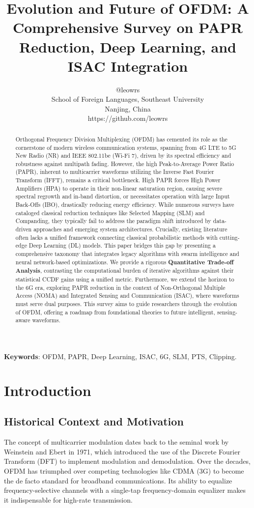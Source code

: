 \documentclass[12pt, a4paper, onecolumn]{article}
\title{\textbf{Evolution and Future of OFDM: A Comprehensive Survey on PAPR Reduction, Deep Learning, and ISAC Integration}}
\author{@leowrs \\
    \small School of Foreign Languages, Southeast University \\
    \small Nanjing, China \\
    \small https://github.com/leowrs}
\date{}
\begin{document}
\maketitle

\begin{abstract}
    Orthogonal Frequency Division Multiplexing (OFDM) has cemented its role as the cornerstone of modern wireless communication systems, spanning from 4G LTE to 5G New Radio (NR) and IEEE 802.11be (Wi-Fi 7), driven by its spectral efficiency and robustness against multipath fading. However, the high Peak-to-Average Power Ratio (PAPR), inherent to multicarrier waveforms utilizing the Inverse Fast Fourier Transform (IFFT), remains a critical bottleneck. High PAPR forces High Power Amplifiers (HPA) to operate in their non-linear saturation region, causing severe spectral regrowth and in-band distortion, or necessitates operation with large Input Back-Offs (IBO), drastically reducing energy efficiency. While numerous surveys have cataloged classical reduction techniques like Selected Mapping (SLM) and Companding, they typically fail to address the paradigm shift introduced by data-driven approaches and emerging system architectures. Crucially, existing literature often lacks a unified framework connecting classical probabilistic methods with cutting-edge Deep Learning (DL) models. This paper bridges this gap by presenting a comprehensive taxonomy that integrates legacy algorithms with swarm intelligence and neural network-based optimizations. We provide a rigorous \textbf{Quantitative Trade-off Analysis}, contrasting the computational burden of iterative algorithms against their statistical CCDF gains using a unified metric. Furthermore, we extend the horizon to the 6G era, exploring PAPR reduction in the context of Non-Orthogonal Multiple Access (NOMA) and Integrated Sensing and Communication (ISAC), where waveforms must serve dual purposes. This survey aims to guide researchers through the evolution of OFDM, offering a roadmap from foundational theories to future intelligent, sensing-aware waveforms.
\end{abstract}

\textbf{Keywords}: OFDM, PAPR, Deep Learning, ISAC, 6G, SLM, PTS, Clipping.

\section{Introduction}

\subsection{Historical Context and Motivation}
The concept of multicarrier modulation dates back to the seminal work by Weinstein and Ebert \cite{ref1} in 1971, which introduced the use of the Discrete Fourier Transform (DFT) to implement modulation and demodulation. Over the decades, OFDM has triumphed over competing technologies like CDMA (3G) to become the de facto standard for broadband communications. Its ability to equalize frequency-selective channels with a single-tap frequency-domain equalizer makes it indispensable for high-rate transmission.
\end{document}
